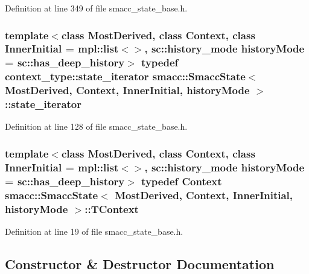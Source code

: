 Definition at line 349 of file smacc\+\_\+state\+\_\+base.\+h.

\subsubsection[{\texorpdfstring{state\+\_\+iterator}{state_iterator}}]{\setlength{\rightskip}{0pt plus 5cm}template$<$class Most\+Derived, class Context, class Inner\+Initial = mpl\+::list$<$$>$, sc\+::history\+\_\+mode history\+Mode = sc\+::has\+\_\+deep\+\_\+history$>$ typedef context\+\_\+type\+::state\+\_\+iterator {\bf smacc\+::\+Smacc\+State}$<$ Most\+Derived, Context, Inner\+Initial, history\+Mode $>$\+::{\bf state\+\_\+iterator}}\hypertarget{classsmacc_1_1SmaccState_a12497b38e710f07cacb5d45efc024339}{}\label{classsmacc_1_1SmaccState_a12497b38e710f07cacb5d45efc024339}


Definition at line 128 of file smacc\+\_\+state\+\_\+base.\+h.

\subsubsection[{\texorpdfstring{T\+Context}{TContext}}]{\setlength{\rightskip}{0pt plus 5cm}template$<$class Most\+Derived, class Context, class Inner\+Initial = mpl\+::list$<$$>$, sc\+::history\+\_\+mode history\+Mode = sc\+::has\+\_\+deep\+\_\+history$>$ typedef Context {\bf smacc\+::\+Smacc\+State}$<$ Most\+Derived, Context, Inner\+Initial, history\+Mode $>$\+::{\bf T\+Context}}\hypertarget{classsmacc_1_1SmaccState_a9953ba0428a8c46f7d72c70bc3f87db4}{}\label{classsmacc_1_1SmaccState_a9953ba0428a8c46f7d72c70bc3f87db4}


Definition at line 19 of file smacc\+\_\+state\+\_\+base.\+h.



\subsection{Constructor \& Destructor Documentation}
